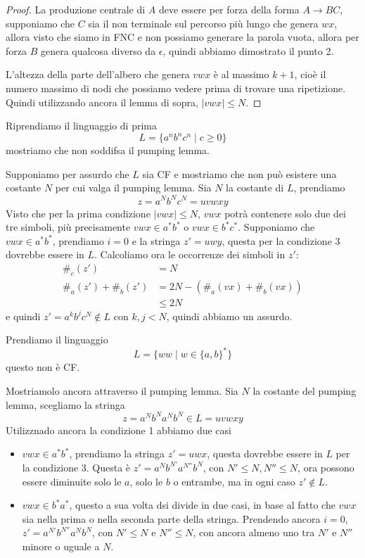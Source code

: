 \documentclass[12pt]{report}
\begin{document}
\begin{proof}
	La produzione centrale di $A$ deve essere per forza della forma $A \rightarrow B C$, supponiamo che $C$ sia il non terminale sul percorso più lungo che genera $w x$, allora visto che siamo in FNC e non possiamo generare la parola vuota, allora per forza $B$ genera qualcosa diverso da $\epsilon$, quindi abbiamo dimostrato il punto 2.

	L'altezza della parte dell'albero che genera $vwx$ è al massimo $k + 1$, cioè il numero massimo di nodi che possiamo vedere prima di trovare una ripetizione.
	Quindi utilizzando ancora il lemma di sopra, $|vwx| \leq N$.
\end{proof}
\begin{tcolorbox}[breakable]
	Riprendiamo il linguaggio di prima
	$$ L = \{ a^n b^n c^n \mid c \geq 0 \} $$
	mostriamo che non soddifsa il pumping lemma.

	Supponiamo per assurdo che $L$ sia CF e mostriamo che non può esistere una costante $N$ per cui valga il pumping lemma.
	Sia $N$ la costante di $L$, prendiamo
	$$ z = a^N b^N c^N = u v w x y $$
	Visto che per la prima condizione $|vwx| \leq N$, $vwx$ potrà contenere solo due dei tre simboli, più precisamente $vwx \in a^* b^*$ o $vwx \in b^* c^*$.
	Supponiamo che $vwx \in a^* b^*$, prendiamo $i = 0$ e la stringa $z' = uwy$, questa per la condizione 3 dovrebbe essere in $L$.
	Calcoliamo ora le occorrenze dei simboli in $z'$:
	\begin{align*}
		\#_c(z') &= N \\
		\#_a(z') + \#_b(z') &= 2N - (\#_a(vx) + \#_b(vx)) \\
		                     &\leq 2N \tag*{\tiny Per la condizione 2 $(\#_a(vx) + \#_b(vx)) \geq 1$}
	\end{align*}
	e quindi $z' = a^k b^j c^N \not \in L$ con $k, j < N$, quindi abbiamo un assurdo.
\end{tcolorbox}

\begin{tcolorbox}[breakable]
	Prendiamo il linguaggio
	$$ L = \{ w w \mid w \in \{a, b\}^* \} $$
	questo non è CF.

	Mostriamolo ancora attraverso il pumping lemma.
	Sia $N$ la costante del pumping lemma, scegliamo la stringa
	$$ z = a^N b^N a^N b^N \in L = u v w x y $$
	Utilizznado ancora la condizione 1 abbiamo due casi
	\begin{itemize}
		\item $vwx \in a^* b^* $, prendiamo la stringa $z' = u w x$, questa dovrebbe essere in $L$ per la condizione 3.
			Questa è $z' = a^N b^{N'} a^{N''} b^N$, con $N' \leq N, N'' \leq N$, ora possono essere diminuite solo le $a$, solo le $b$ o entrambe, ma in ogni caso $z' \not \in L$.
		\item $vwx \in b^* a^*$, questo a sua volta dsi divide in due casi, in base al fatto che $vwx$ sia nella prima o nella seconda parte della stringa.
			Prendendo ancora $i = 0$, $z' = a^{N'} b^{N''} a^N b^N$, con $N' \leq N$ e $N'' \leq N$, con ancora almeno uno tra $N'$ e $N''$ minore o uguale a $N$.
	\end{itemize}
\end{tcolorbox}
\end{document}
